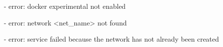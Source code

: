 
- error: docker experimental not enabled

- error: network <net_name> not found

- error: service failed because the network has not already been created
